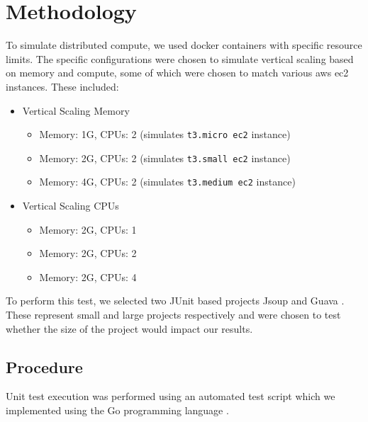 \section{Methodology}
\label{Methodology}


To simulate distributed compute, we used docker containers \cite{docker} with specific resource limits. The specific configurations were chosen to simulate vertical scaling based on memory and compute, some of which were chosen to match various aws ec2 instances. These included:
\begin{itemize}
    \item Vertical Scaling Memory 
    \begin{itemize}
        \item Memory: 1G, CPUs: 2 (simulates \texttt{t3.micro ec2} instance) 
        \item Memory: 2G, CPUs: 2 (simulates \texttt{t3.small ec2} instance) 
        \item Memory: 4G, CPUs: 2 (simulates \texttt{t3.medium ec2} instance) 
    \end{itemize}
    \item Vertical Scaling CPUs 
    \begin{itemize}
        \item Memory: 2G, CPUs: 1 
        \item Memory: 2G, CPUs: 2 
        \item Memory: 2G, CPUs: 4 
    \end{itemize}
\end{itemize}

To perform this test, we selected two JUnit based projects Jsoup \cite{jsoup} and Guava \cite{guava}. These represent small and large projects respectively and were chosen to test whether the size of the project would impact our results.

\subsection{Procedure}
\label{Procedure}

Unit test execution was performed using an automated test script which we implemented using the Go programming language \cite{testscript}. 

